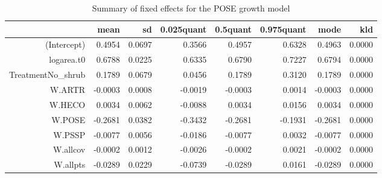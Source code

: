 \begin{table}[ht]
\centering
\caption{Summary of fixed effects for the POSE growth model} 
\label{POSEgrowth}
\begin{tabular}{rrrrrrrr}
  \hline
 & mean & sd & 0.025quant & 0.5quant & 0.975quant & mode & kld \\ 
  \hline
(Intercept) & 0.4954 & 0.0697 & 0.3566 & 0.4957 & 0.6328 & 0.4963 & 0.0000 \\ 
  logarea.t0 & 0.6788 & 0.0225 & 0.6335 & 0.6790 & 0.7227 & 0.6794 & 0.0000 \\ 
  TreatmentNo\_shrub & 0.1789 & 0.0679 & 0.0456 & 0.1789 & 0.3120 & 0.1789 & 0.0000 \\ 
  W.ARTR & -0.0003 & 0.0008 & -0.0019 & -0.0003 & 0.0014 & -0.0003 & 0.0000 \\ 
  W.HECO & 0.0034 & 0.0062 & -0.0088 & 0.0034 & 0.0156 & 0.0034 & 0.0000 \\ 
  W.POSE & -0.2681 & 0.0382 & -0.3432 & -0.2681 & -0.1931 & -0.2681 & 0.0000 \\ 
  W.PSSP & -0.0077 & 0.0056 & -0.0186 & -0.0077 & 0.0032 & -0.0077 & 0.0000 \\ 
  W.allcov & -0.0002 & 0.0012 & -0.0026 & -0.0002 & 0.0021 & -0.0002 & 0.0000 \\ 
  W.allpts & -0.0289 & 0.0229 & -0.0739 & -0.0289 & 0.0161 & -0.0289 & 0.0000 \\ 
   \hline
\end{tabular}
\end{table}

